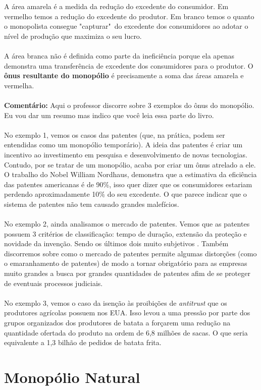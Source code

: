 \documentclass[a4paper,11pt,oneside]{book}
\theoremstyle{definition}
\theoremstyle{break}
\begin{document}
A área amarela é a medida da redução do excedente do consumidor. Em vermelho temos a redução do excedente do produtor. Em branco temos o quanto o monopolista consegue "capturar"\ do excedente dos consumidores ao adotar o nível de produção que maximiza o seu lucro.
\\
\\
A área branca não é definida como parte da ineficiência porque ela apenas demonstra uma transferência de excedente dos consumidores para o produtor. O \textbf{ônus resultante do monopólio} é precisamente a soma das áreas amarela e vermelha.
\\
\\
\textbf{Comentário:} Aqui o professor discorre sobre 3 exemplos do ônus do monopólio. Eu vou dar um resumo mas indico que você leia essa parte do livro.
\\
\\
No exemplo 1, vemos os casos das patentes (que, na prática, podem ser entendidas como um monopólio temporário). A ideia das patentes é criar um incentivo ao investimento em pesquisa e desenvolvimento de novas tecnologias. Contudo, por se tratar de um monopólio, acaba por criar um ônus atrelado a ele. O trabalho do Nobel William Nordhaus, demonstra que a estimativa da eficiência das patentes americanas é de 90\%, isso quer dizer que os consumidores estariam perdendo aproximadamente 10\% do seu excedente. O que parece indicar que o sistema de patentes não tem causado grandes malefícios.
\\
\\
No exemplo 2, ainda analisamos o mercado de patentes. Vemos que as patentes possuem 3 critérios de classificação: tempo de duração, extensão da proteção e novidade da invenção. Sendo os últimos dois muito subjetivos . Também discorremos sobre como o mercado de patentes permite algumas distorções (como o emaranhamento de patentes) de modo a tornar obrigatório para as empresas muito grandes a busca por grandes quantidades de patentes afim de se proteger de eventuais processos judiciais.
\\
\\
No exemplo 3, vemos o caso da isenção às proibições de \textit{antitrust} que os produtores agrícolas possuem nos EUA. Isso levou a uma pressão por parte dos grupos organizados dos produtores de batata a forçarem uma redução na quantidade ofertada do produto na ordem de 6,8 milhões de sacas. O que seria equivalente a 1,3 bilhão de pedidos de batata frita.

\section{Monopólio Natural}
\end{document}
